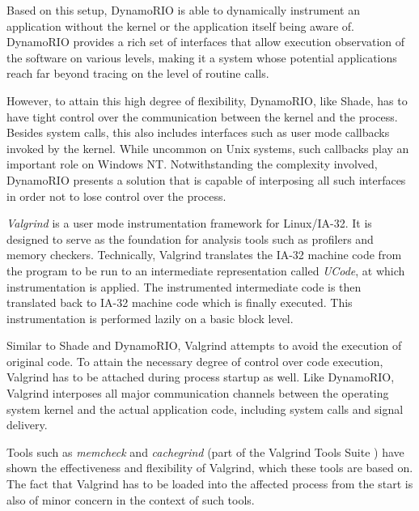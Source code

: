 Based on this setup, DynamoRIO is able to dynamically instrument an application 
without the kernel or the application itself being aware of. DynamoRIO provides 
a rich set of interfaces that allow execution observation of the software on various levels, 
making it a system whose potential applications reach far beyond tracing on the
level of routine calls.

However, to attain this high degree of flexibility, DynamoRIO, like Shade, has to have 
tight control over the communication between the kernel and the process. Besides
system calls, this also includes interfaces such as user mode callbacks invoked 
by the kernel. While uncommon on Unix systems, such callbacks play an important 
role on Windows NT. Notwithstanding the complexity involved, DynamoRIO presents 
a solution that is capable of interposing all such interfaces in order not to lose
control over the process.


\emph{Valgrind} \cite{Nethercote04} is a user mode instrumentation 
framework for Linux/IA-32. It is designed to serve
as the foundation for analysis tools such as profilers and 
memory checkers. Technically, Valgrind translates the IA-32 machine 
code from the program to be run to an intermediate representation called 
\emph{UCode}, at which instrumentation is applied. The instrumented intermediate code 
is then translated back to IA-32 machine code which is finally executed. This instrumentation
is performed lazily on a basic block level.

Similar to Shade and DynamoRIO, Valgrind attempts to avoid the execution of original code. To
attain the necessary degree of control over code execution, Valgrind has to be 
attached during process startup as well. Like DynamoRIO, Valgrind interposes all major communication 
channels between the operating system kernel and the actual application code, including 
system calls and signal delivery.

Tools such as \emph{memcheck} and \emph{cachegrind} (part of the Valgrind Tools Suite \cite{ValgrindTools}) have 
shown the effectiveness and flexibility of Valgrind, which these tools are 
based on. The fact that Valgrind has to be loaded into the affected
process from the start is also of minor concern in the context of such tools. 


